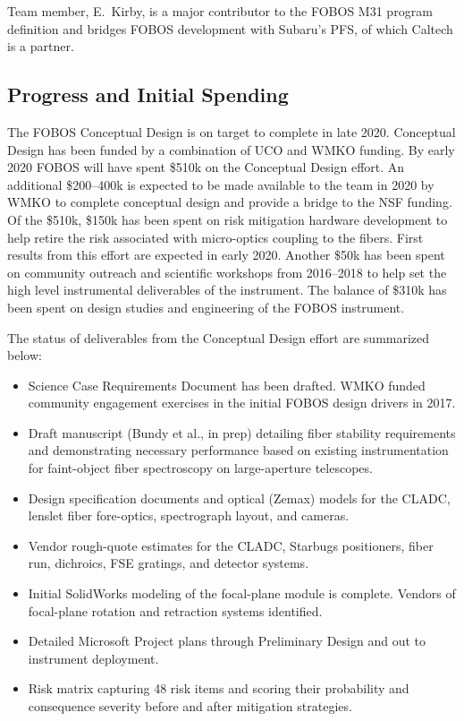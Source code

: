 \documentclass[oneside,11pt]{amsart}
\begin{document}
 Team member, E.~Kirby, is a major
contributor to the FOBOS M31 program definition and bridges FOBOS
development with Subaru's PFS, of which Caltech is a partner.

\subsection{Progress and Initial Spending}

The FOBOS Conceptual Design is on target to complete in late 2020.
Conceptual Design has been funded by a combination of UCO and WMKO
funding. By early 2020 FOBOS will have spent \$510k on the Conceptual
Design effort. An additional \$200--400k is expected to be made
available to the team in 2020 by WMKO to complete conceptual design
and provide a bridge to the NSF funding. Of the \$510k, \$150k has
been spent on risk mitigation hardware development to help retire the
risk associated with micro-optics coupling to the fibers. First
results from this effort are expected in early 2020. Another \$50k
has been spent on community outreach and scientific workshops from
2016--2018 to help set the high level instrumental deliverables of
the instrument. The balance of \$310k has been spent on design
studies and engineering of the FOBOS instrument.

\noindent The status of deliverables from the Conceptual Design
effort are summarized below:

\begin{itemize}
%
\item Science Case Requirements Document has been drafted. WMKO
funded community engagement exercises in the initial FOBOS design
drivers in 2017.

%
\item Draft manuscript (Bundy et al., in prep) detailing fiber
stability requirements and demonstrating necessary performance based
on existing instrumentation for faint-object fiber spectroscopy on
large-aperture telescopes.
%
\item Design specification documents and optical (Zemax) models for
the CLADC, lenslet fiber fore-optics, spectrograph layout, and
cameras.
%
\item Vendor rough-quote estimates for the CLADC, Starbugs
positioners, fiber run, dichroics, FSE gratings, and detector
systems.
%
\item Initial SolidWorks modeling of the focal-plane module is
complete. Vendors of focal-plane rotation and retraction systems
identified.
%
\item Detailed Microsoft Project plans through Preliminary Design and
out to instrument deployment.
%
\item Risk matrix capturing 48 risk items and scoring their
probability and consequence severity before and after mitigation
strategies.
%
\end{itemize}
\end{document}
